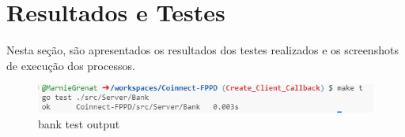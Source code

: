 \documentclass[a4paper,10pt]{article}
\begin{document}
\newpage

\section{Resultados e Testes}
Nesta seção, são apresentados os resultados dos testes realizados e os screenshots de execução dos processos.

\begin{figure}[h!]
    \centering
    \includegraphics[width=1\linewidth]{assets/image.png}
    \caption{bank test output}
    \label{fig:enter-label}
\end{figure}
\end{document}
